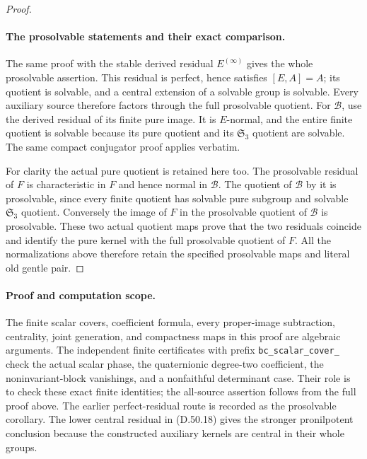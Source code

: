 \begin{proof}
\paragraph{The prosolvable statements and their exact comparison.}
The same proof with the stable derived residual
\(E^{(\infty)}\) gives the whole prosolvable assertion.
This residual is perfect, hence satisfies \([E,A]=A\);
its quotient is solvable, and a central extension of
a solvable group is solvable. Every auxiliary source
therefore factors through the full prosolvable quotient.
For \(\mathcal B\), use the derived residual of its
finite pure image. It is \(E\)-normal, and the entire
finite quotient is solvable because its pure quotient
and its \(\mathfrak S_3\) quotient are solvable.
The same compact conjugator proof applies verbatim.

For clarity the actual pure quotient is retained here
too. The prosolvable residual of \(F\) is characteristic
in \(F\) and hence normal in \(\mathcal B\).
The quotient of \(\mathcal B\) by it is prosolvable,
since every finite quotient has solvable pure subgroup
and solvable \(\mathfrak S_3\) quotient.
Conversely the image of \(F\) in the prosolvable
quotient of \(\mathcal B\) is prosolvable.
These two actual quotient maps prove that the two
residuals coincide and identify the pure kernel with
the full prosolvable quotient of \(F\).
All the normalizations above therefore retain the
specified prosolvable maps and literal old gentle pair.
\end{proof}

\paragraph{Proof and computation scope.}
The finite scalar covers, coefficient formula, every proper-image
subtraction, centrality, joint generation, and compactness maps in
this proof are algebraic arguments. The independent finite
certificates with prefix \texttt{bc\_scalar\_cover\_} check the
actual scalar phase, the quaternionic degree-two coefficient,
the noninvariant-block vanishings, and a nonfaithful determinant
case. Their role is to check these exact finite identities; the
all-source assertion follows from the full proof above.
The earlier perfect-residual route is recorded as the prosolvable
corollary. The lower central residual in
\textup{(D.50.18)} gives the stronger pronilpotent conclusion because
the constructed auxiliary kernels are central in their whole groups.
